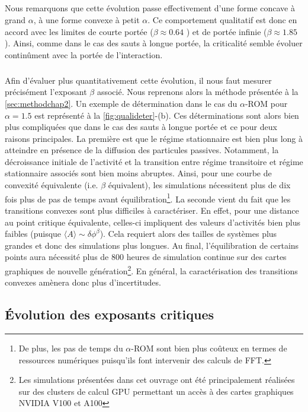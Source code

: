 \subparagraph{}Nous remarquons que cette évolution passe effectivement d'une forme concave à grand $\alpha$, à une forme convexe à petit $\alpha$. Ce comportement qualitatif est donc en accord avec les limites de courte portée ($\beta  \approx 0.64$ \cite{lubeck_universal_2004}) et de portée infinie ($\beta\approx 1.85$ \cite{mari_absorbing_2022}). Ainsi, comme dans le cas des sauts à longue portée, la criticalité semble évoluer continûment avec la portée de l'interaction.

\subparagraph{}Afin d'évaluer plus quantitativement cette évolution, il nous faut mesurer précisément l'exposant $\beta$ associé. Nous reprenons alors la méthode présentée à la \autoref{sec:methodchap2}. Un exemple de détermination dans le cas du $\alpha$-ROM pour $\alpha = 1.5$ est représenté à la \autoref{fig:qualideter}-(b). Ces déterminations sont alors bien plus compliquées que dans le cas des sauts à longue portée et ce pour deux raisons principales. La première est que le régime stationnaire est bien plus long à atteindre en présence de la diffusion des particules passives. Notamment, la décroissance initiale de l'activité et la transition entre régime transitoire et régime stationnaire associés sont bien moins abruptes. Ainsi, pour une courbe de convexité équivalente (i.e. $\beta$ équivalent), les simulations nécessitent plus de dix fois plus de pas de temps avant équilibration\footnote{De plus, les pas de temps du $\alpha$-ROM sont bien plus coûteux en termes de ressources numériques puisqu'ils font intervenir des calculs de FFT.}. La seconde vient du fait que les transitions convexes sont plus difficiles à caractériser. En effet, pour une distance au point critique équivalente, celles-ci impliquent des valeurs d'activités bien plus faibles (puisque $\langle A \rangle \sim \delta\phi^\beta$). Cela requiert alors des tailles de systèmes plus grandes et donc des simulations plus longues. Au final, l'équilibration de certains points aura nécessité plus de 800 heures de simulation continue sur des cartes graphiques de nouvelle génération\footnote{Les simulations présentées dans cet ouvrage ont été principalement réalisées sur des clusters de calcul GPU permettant un accès à des cartes graphiques NVIDIA V100 et A100}. En général, la caractérisation des transitions convexes amènera donc plus d'incertitudes.

\subsection{Évolution des exposants critiques}


